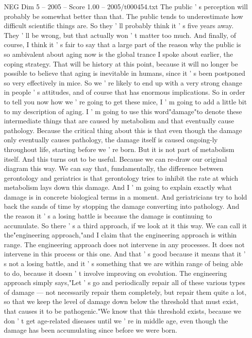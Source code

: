 \begin{textsample}{NEG Dim 5 – 2005 – Score 1.00 – 2005/t000454.txt}
The public ' s perception will probably be somewhat better than that.
The public tends to underestimate how difficult scientific things are.
So they ' ll probably think it ' s five years away.
They ' ll be wrong, but that actually won ' t matter too much.
And finally, of course, I think it ' s fair to say that a large part of the reason why the public is so ambivalent about aging now is the global trance I spoke about earlier, the coping strategy.
That will be history at this point, because it will no longer be possible to believe that aging is inevitable in humans, since it ' s been postponed so very effectively in mice.
So we ' re likely to end up with a very strong change in people ' s attitudes, and of course that has enormous implications.
So in order to tell you now how we ' re going to get these mice, I ' m going to add a little bit to my description of aging.
I ' m going to use this word"damage"to denote these intermediate things that are caused by metabolism and that eventually cause pathology.
Because the critical thing about this is that even though the damage only eventually causes pathology, the damage itself is caused ongoing-ly throughout life, starting before we ' re born.
But it is not part of metabolism itself.
And this turns out to be useful.
Because we can re-draw our original diagram this way.
We can say that, fundamentally, the difference between gerontology and geriatrics is that gerontology tries to inhibit the rate at which metabolism lays down this damage.
And I ' m going to explain exactly what damage is in concrete biological terms in a moment.
And geriatricians try to hold back the sands of time by stopping the damage converting into pathology.
And the reason it ' s a losing battle is because the damage is continuing to accumulate.
So there ' s a third approach, if we look at it this way.
We can call it the"engineering approach,"and I claim that the engineering approach is within range.
The engineering approach does not intervene in any processes.
It does not intervene in this process or this one.
And that ' s good because it means that it ' s not a losing battle, and it ' s something that we are within range of being able to do, because it doesn ' t involve improving on evolution.
The engineering approach simply says,"Let ' s go and periodically repair all of these various types of damage — not necessarily repair them completely, but repair them quite a lot, so that we keep the level of damage down below the threshold that must exist, that causes it to be pathogenic."We know that this threshold exists, because we don ' t get age-related diseases until we ' re in middle age, even though the damage has been accumulating since before we were born.

\end{textsample}
